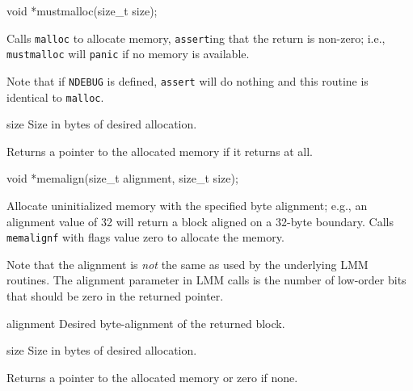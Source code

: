 \label{mustmalloc}
\begin{apisyn}

	\funcproto void *mustmalloc(size_t size);
\end{apisyn}
\begin{apidesc}
	Calls {\tt malloc} to allocate memory,
	{\tt assert}ing that the return is non-zero;
	i.e., {\tt mustmalloc} will {\tt panic} if no memory is available.

	Note that if {\tt NDEBUG} is defined, {\tt assert} will do
	nothing and this routine is identical to {\tt malloc}.
\end{apidesc}
\begin{apiparm}
	\item[size]
		Size in bytes of desired allocation.
\end{apiparm}
\begin{apiret}
	Returns a pointer to the allocated memory if it returns at all.
\end{apiret}

\label{memalign}
\begin{apisyn}

	\funcproto void *memalign(size_t alignment, size_t size);
\end{apisyn}
\begin{apidesc}
	Allocate uninitialized memory with the specified byte alignment;
	e.g., an alignment value of 32 will return a block aligned on a
	32-byte boundary.
	Calls {\tt memalignf} with flags value zero to allocate the memory.

	Note that the alignment is \emph{not} the same as used by the
	underlying LMM routines.  The alignment parameter in LMM calls
	is the number of low-order bits that should be zero in the
	returned pointer.
\end{apidesc}
\begin{apiparm}
	\item[alignment]
		Desired byte-alignment of the returned block.
	\item[size]
		Size in bytes of desired allocation.
\end{apiparm}
\begin{apiret}
	Returns a pointer to the allocated memory or zero if none.
\end{apiret}

